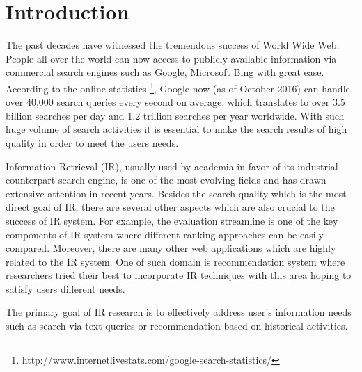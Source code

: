 %
%
\chapter{Introduction}
The past decades have witnessed the tremendous success of World Wide Web. 
People all over the world can now access to publicly available 
information via commercial search engines such as Google, Microsoft Bing 
with great ease. According to the online statistics \footnote{http://www.internetlivestats.com/google-search-statistics/}, 
Google now (as of October 2016) can handle over 40,000 search queries 
every second on average, which translates to over 3.5 billion searches 
per day and 1.2 trillion searches per year worldwide. 
With such huge volume of search activities it is essential to make the 
search results of high quality in order to meet the users needs.

Information Retrieval (IR), usually used by academia in favor of its 
industrial counterpart search engine, 
is one of the most evolving fields and has drawn extensive attention in 
recent years. 
Besides the search quality which is the most direct goal of IR, there 
are several other aspects which are also crucial to the success of IR 
system. For example, the evaluation streamline is one of the key 
components of IR system where different ranking approaches can be 
easily compared. Moreover, there are many other web applications which 
are highly related to the IR system. One of such domain is recommendation 
system where researchers tried their best to incorporate IR techniques 
with this area hoping to satisfy users different needs.


The primary goal of IR research is to effectively address user's 
information needs such as search via text queries or recommendation 
based on historical activities. 

